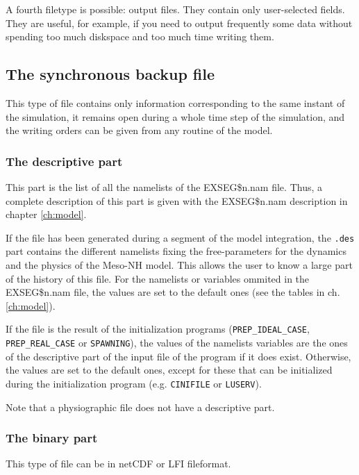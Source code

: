 A fourth filetype is possible: output files. They contain only user-selected fields.
They are useful, for example, if you need to output frequently some data without spending too much diskspace
and too much time writing them.


\subsection{The synchronous backup file} \label{ss:synchro}

This type of file contains only information corresponding to the same instant
of the simulation, it remains open during a whole time step of the simulation,
and the writing orders can be given from any routine of the model.

\subsubsection{The descriptive part}
This part is the list of all the namelists of the EXSEG\$n.nam file.
Thus, a complete description of this part is given
with the EXSEG\$n.nam description in chapter \ref{ch:model}.

If the file has been generated during a segment of the model integration, the 
{\tt .des} part contains the different
namelists fixing the free-parameters for the dynamics and the physics 
of the Meso-NH model. This allows the user to know a large
part of the history of this file. For the namelists or variables ommited 
in the EXSEG\$n.nam file, the values are set to the default ones
 (see the tables in ch.\ref{ch:model}).

If the file is the result of the initialization programs 
({\tt PREP\_IDEAL\_CASE}, {\tt PREP\_REAL\_CASE} or {\tt SPAWNING}),
 the values of the namelists variables are the ones of the descriptive part
of the input file of the program if it does exist. Otherwise, the values are
set to the default ones, except for these that can be initialized during the
initialization program (e.g. {\tt CINIFILE} or {\tt LUSERV}).

Note that a physiographic file does not have a descriptive part.

\subsubsection{The binary part}

This type of file can be in netCDF or LFI fileformat.


